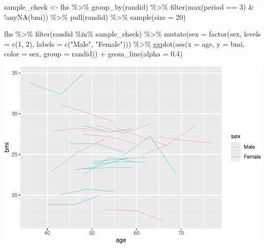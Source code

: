 \documentclass[
]{book}
\newenvironment{Shaded}{\begin{snugshade}}{\end{snugshade}}
\newcommand{\AttributeTok}[1]{\textcolor[rgb]{0.77,0.63,0.00}{#1}}
\newcommand{\DecValTok}[1]{\textcolor[rgb]{0.00,0.00,0.81}{#1}}
\newcommand{\FloatTok}[1]{\textcolor[rgb]{0.00,0.00,0.81}{#1}}
\newcommand{\FunctionTok}[1]{\textcolor[rgb]{0.00,0.00,0.00}{#1}}
\newcommand{\NormalTok}[1]{#1}
\newcommand{\OtherTok}[1]{\textcolor[rgb]{0.56,0.35,0.01}{#1}}
\newcommand{\SpecialCharTok}[1]{\textcolor[rgb]{0.00,0.00,0.00}{#1}}
\newcommand{\StringTok}[1]{\textcolor[rgb]{0.31,0.60,0.02}{#1}}
\begin{document}
\begin{Shaded}
\begin{Highlighting}[]
\NormalTok{sample\_check }\OtherTok{\textless{}{-}}\NormalTok{ fhs }\SpecialCharTok{\%\textgreater{}\%} 
  \FunctionTok{group\_by}\NormalTok{(randid) }\SpecialCharTok{\%\textgreater{}\%} 
  \FunctionTok{filter}\NormalTok{(}\FunctionTok{max}\NormalTok{(period }\SpecialCharTok{==} \DecValTok{3}\NormalTok{) }\SpecialCharTok{\&} \SpecialCharTok{!}\FunctionTok{anyNA}\NormalTok{(bmi)) }\SpecialCharTok{\%\textgreater{}\%} 
  \FunctionTok{pull}\NormalTok{(randid) }\SpecialCharTok{\%\textgreater{}\%} 
  \FunctionTok{sample}\NormalTok{(}\AttributeTok{size =} \DecValTok{20}\NormalTok{)}

\NormalTok{fhs }\SpecialCharTok{\%\textgreater{}\%} 
  \FunctionTok{filter}\NormalTok{(randid }\SpecialCharTok{\%in\%}\NormalTok{ sample\_check) }\SpecialCharTok{\%\textgreater{}\%} 
  \FunctionTok{mutate}\NormalTok{(}\AttributeTok{sex =} \FunctionTok{factor}\NormalTok{(sex, }\AttributeTok{levels =} \FunctionTok{c}\NormalTok{(}\DecValTok{1}\NormalTok{, }\DecValTok{2}\NormalTok{), }\AttributeTok{labels =} \FunctionTok{c}\NormalTok{(}\StringTok{"Male"}\NormalTok{, }\StringTok{"Female"}\NormalTok{))) }\SpecialCharTok{\%\textgreater{}\%}  
  \FunctionTok{ggplot}\NormalTok{(}\FunctionTok{aes}\NormalTok{(}\AttributeTok{x =}\NormalTok{ age, }\AttributeTok{y =}\NormalTok{ bmi, }\AttributeTok{color =}\NormalTok{ sex, }\AttributeTok{group =}\NormalTok{ randid)) }\SpecialCharTok{+}
  \FunctionTok{geom\_line}\NormalTok{(}\AttributeTok{alpha =} \FloatTok{0.4}\NormalTok{)}
\end{Highlighting}
\end{Shaded}

\includegraphics{adv_epi_analysis_files/figure-latex/unnamed-chunk-193-1.pdf}
\end{document}

